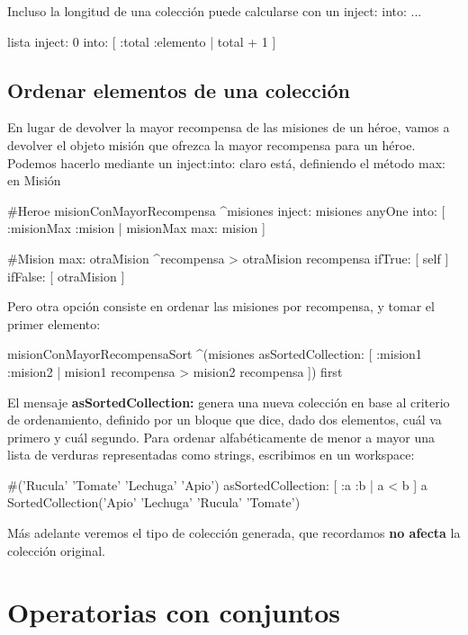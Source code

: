 \documentclass[a4paper,12pt]{book}
\begin{document}
Incluso la longitud de una colección puede calcularse con un inject: into: ...

\begin{code}
lista inject: 0
      into: [ :total :elemento | total + 1 ] 
\end{code}


\subsection{Ordenar elementos de una colección}
En lugar de devolver la mayor recompensa de las misiones de un héroe, vamos a devolver el objeto misión que
ofrezca la mayor recompensa para un héroe. Podemos hacerlo mediante un inject:into: claro está, definiendo el
método max: en Misión

\begin{code}
#Heroe
misionConMayorRecompensa
   ^misiones inject: misiones anyOne
             into: [ :misionMax :mision | misionMax max: mision ] 
             
#Mision
max: otraMision
    ^recompensa > otraMision recompensa
          ifTrue: [ self ]
          ifFalse: [ otraMision ]
\end{code}

Pero otra opción consiste en ordenar las misiones por recompensa, y tomar el primer elemento:

\begin{code}
misionConMayorRecompensaSort
   ^(misiones asSortedCollection: [ :mision1 :mision2 | mision1 recompensa > mision2 recompensa ])
       first
\end{code}

El mensaje \textbf{asSortedCollection:} genera una nueva colección en base al criterio de ordenamiento, definido
por un bloque que dice, dado dos elementos, cuál va primero y cuál segundo. Para ordenar alfabéticamente
de menor a mayor una lista de verduras representadas como strings, escribimos en un workspace: 

\begin{code}
#('Rucula' 'Tomate' 'Lechuga' 'Apio') asSortedCollection: [ :a :b | a < b ]
    a SortedCollection('Apio' 'Lechuga' 'Rucula' 'Tomate')
\end{code}

Más adelante veremos el tipo de colección generada, que recordamos \textbf{no afecta} la colección original.

\section{Operatorias con conjuntos}
\end{document}
